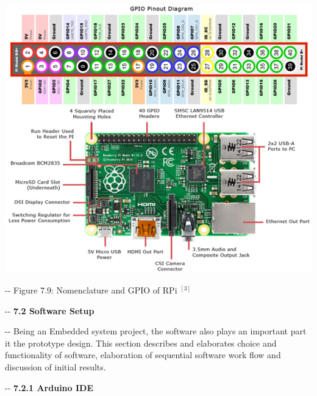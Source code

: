 \documentclass[12pt]{article}
\makeatletter
\newenvironment{indentation}[3]%
	{\par\setlength{\parindent}{#3}
	\setlength{\leftmargin}{#1}       \setlength{\rightmargin}{#2}%
	\advance\linewidth -\leftmargin       \advance\linewidth -\rightmargin%
	\advance\@totalleftmargin\leftmargin  \@setpar{{\@@par}}%
	\parshape 1\@totalleftmargin \linewidth\ignorespaces}{\par}%
\makeatother
\begin{document}
\includegraphics[width=415pt]{img-22.png}
\begin{center}
\begin{indentation}{0pt}{0pt}{0pt}
Figure 7.9: Nomenclature and GPIO of RPi 
$^{[3]}$

\end{indentation}
\end{center}

\begin{indentation}{0pt}{0pt}{0pt}
\textbf{{\large 7.2 Software Setup}}
\end{indentation}

\begin{indentation}{0pt}{0pt}{0pt}
Being an Embedded system project, the software also plays an important part it
the prototype design. This section describes and elaborates choice and
functionality of software, elaboration of sequential software work flow and
discussion of initial results.
\end{indentation}

\begin{indentation}{0pt}{0pt}{0pt}
\textbf{7.2.1 Arduino IDE}
\end{indentation}
\end{document}

